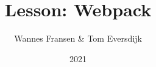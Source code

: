 \documentclass{beamer}
\title{Lesson: Webpack}
\author{Wannes Fransen \& Tom Eversdijk}
\institute{UC Leuven}
\date{2021}
\begin{document}
\frame{\titlepage}



\end{document}

